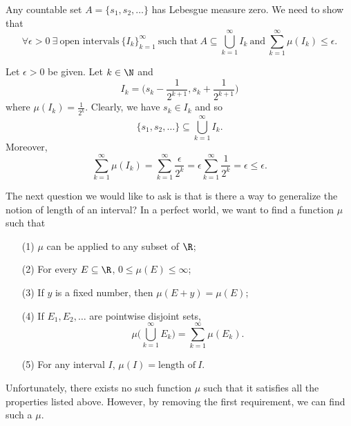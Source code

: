 \begin{eg}
    Any countable set \( A = \{  {s}_{1}, {s}_{2}, \dots  \}   \) has Lebesgue measure zero. We need to show that 
    \[  \forall \epsilon > 0 \  \exists \ \text{open intervals} \ \{ {I}_{k} \}_{k=1}^{\infty} \ \text{such that} \ A \subseteq \bigcup_{ k=1  }^{ \infty  }  {I}_{k } \ \text{and} \ \sum_{ k=1  }^{ \infty  }\mu({I}_{k}) \leq \epsilon.   \]

    Let \( \epsilon > 0 \) be given. Let \( k \in \N  \) and 
    \[  {I}_{k} = \Big(  {s}_{k } - \frac{ 1 }{ 2^{k+1} }  , {s}_{k} + \frac{ 1  }{ 2^{k+1} }  \Big) \]
    where \( \mu({I}_{k})  = \frac{ 1 }{ 2^{k} } \). Clearly, we have \( {s}_{k} \in {I}_{k} \) and so 
    \[  \{ {s}_{1}, {s}_{2}, \dots  \} \subseteq  \bigcup_{ k=1  }^{ \infty  }  {I}_{k}. \]
    Moreover, 
    \[  \sum_{ k=1  }^{ \infty  } \mu({I}_{k}) = \sum_{ k=1  }^{ \infty  } \frac{ \epsilon }{ 2^{k} }  = \epsilon \sum_{ k=1  }^{ \infty  } \frac{ 1 }{ 2^{k} } = \epsilon \leq \epsilon. \]
\end{eg}

The next question we would like to ask is that is there a way to generalize the notion of length of an interval? In a perfect world, we want to find a function \( \mu  \) such that  
\begin{enumerate}
    \item[(1)] \( \mu \) can be applied to any subset of \( \R  \);
    \item[(2)] For every \( E \subseteq \R   \), \( 0 \leq \mu(E) \leq \infty  \);
    \item[(3)] If \( y  \) is a fixed number, then \( \mu(E + y) = \mu(E) \);
    \item[(4)] If \( {E}_{1}, {E}_{2}, \dots  \) are pointwise disjoint sets, 
        \[  \mu \Big(  \bigcup_{ k=1  }^{ \infty  }  {E}_{k} \Big) = \sum_{ k=1  }^{ \infty  } \mu({E}_{k}). \]
    \item[(5)] For any interval \( I  \), \( \mu(I) = \text{length of} \ I \).
\end{enumerate}
Unfortunately, there exists no such function \( \mu  \) such that it satisfies all the properties listed above. However, by removing the first requirement, we can find such a \( \mu  \).


